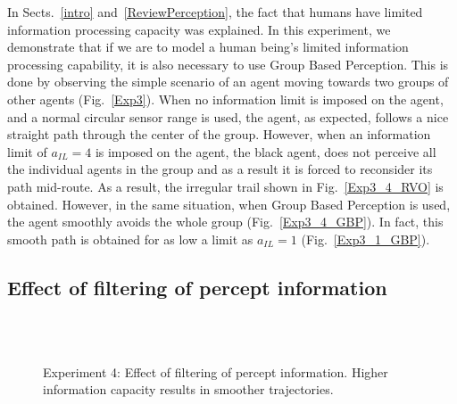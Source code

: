 \documentclass[runningheads,a4paper]{llncs}
\begin{document}
In Sects.~\ref{intro} and~\ref{ReviewPerception}, the fact that humans have limited information processing capacity was explained. In this experiment, we demonstrate that if we are to model a human being's limited information processing capability, it is also necessary to use Group Based Perception. This is done by observing the simple scenario of an agent moving towards two groups of other agents (Fig.~\ref{Exp3}). When no information limit is imposed on the agent, and a normal circular sensor range is used, the agent, as expected, follows a nice straight path through the center of the group. However, when an information limit of $a_{IL} = 4$ is imposed on the agent, the black agent, does not perceive all the individual agents in the group and  as a result it is forced to reconsider its path mid-route. As a result, the irregular trail shown in Fig.~\ref{Exp3_4_RVO} is obtained. However, in the same situation, when Group Based Perception is used, the agent smoothly avoids the whole group (Fig.~\ref{Exp3_4_GBP}). In fact, this smooth path is obtained for as low a limit as $a_{IL} = 1$ (Fig.~\ref{Exp3_1_GBP}).  

\subsection{Effect of filtering of percept information}

\begin{figure}[!tb]
  \centering
   \\
  \hspace{1pt}
  \\
  \hspace{1pt}
  \caption{Experiment 4: Effect of filtering of percept information. Higher information capacity results in smoother trajectories.}
  \label{Exp4}
\end{figure}
\end{document}
